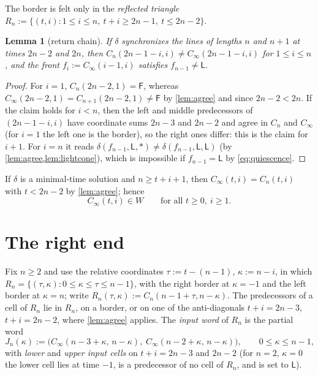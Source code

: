\documentclass[3p]{elsarticle}
\newtheorem{lemma}[theorem]{Lemma}
\theoremstyle{definition}
\newcommand{\Lq}{\mathsf L}
\newcommand{\Fq}{\mathsf F}
\begin{document}
The border is felt only in the \emph{reflected triangle}
$R_n:=\{(t,i):1\le i\le n,\ t+i\ge 2n-1,\ t\le 2n-2\}$.

\begin{lemma}[return chain]\label{lem:return}
If $\delta$ synchronizes the lines of lengths $n$ and $n+1$ at times $2n-2$
and $2n$, then $C_n(2n-1-i,i)\ne C_\infty(2n-1-i,i)$ for $1\le i\le n$, and the
\emph{front} $f_i:=C_\infty(i-1,i)$ satisfies $f_{n-1}\ne\Lq$.
\end{lemma}

\begin{proof}
For $i=1$, $C_n(2n-2,1)=\Fq$, whereas $C_\infty(2n-2,1)=C_{n+1}(2n-2,1)\ne\Fq$
by \cref{lem:agree} and since $2n-2<2n$. If the claim holds for $i<n$, then
the left and middle predecessors of $(2n-1-i,i)$ have coordinate sums $2n-3$
and $2n-2$ and agree in $C_n$ and $C_\infty$ (for $i=1$ the left one is the
border), so the right ones differ: this is the claim for $i+1$. For $i=n$ it
reads $\delta(f_{n-1},\Lq,\ast)\ne\delta(f_{n-1},\Lq,\Lq)$ (by
\cref{lem:agree,lem:lightcone}), which is impossible if $f_{n-1}=\Lq$ by
\eqref{eq:quiescence}.
\end{proof}

If $\delta$ is a minimal-time solution and $n\ge t+i+1$, then
$C_\infty(t,i)=C_n(t,i)$ with $t<2n-2$ by \cref{lem:agree}; hence
\begin{equation}\label{eq:neverfire}
C_\infty(t,i)\in W\qquad\text{for all }t\ge0,\ i\ge1 .
\end{equation}

\section{The right end}\label{sec:right}

Fix $n\ge2$ and use the relative coordinates $\tau:=t-(n-1)$, $\kappa:=n-i$, in
which $R_n=\{(\tau,\kappa):0\le\kappa\le\tau\le n-1\}$, with the right border
at $\kappa=-1$ and the left border at $\kappa=n$; write
$R_n(\tau,\kappa):=C_n(n-1+\tau,n-\kappa)$. The predecessors of a cell of $R_n$
lie in $R_n$, on a border, or on one of the anti-diagonals $t+i=2n-3$,
$t+i=2n-2$, where \cref{lem:agree} applies. The \emph{input word} of $R_n$ is
the partial word
\[
J_n(\kappa):=\bigl(C_\infty(n-3+\kappa,\,n-\kappa),\;C_\infty(n-2+\kappa,\,n-\kappa)\bigr),
\qquad 0\le\kappa\le n-1,
\]
with \emph{lower} and \emph{upper input cells} on $t+i=2n-3$ and $2n-2$ (for
$n=2$, $\kappa=0$ the lower cell lies at time $-1$, is a predecessor of no cell
of $R_n$, and is set to $\Lq$).
\end{document}

